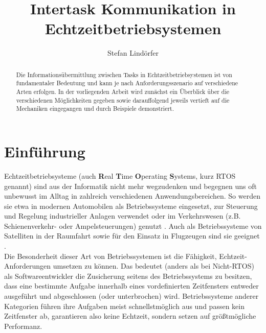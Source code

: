 \documentclass{llncs}
\begin{document}
\title{Intertask Kommunikation in Echtzeitbetriebsystemen}
\author{Stefan Lindörfer}

\date{}

\maketitle

\renewcommand{\abstractname}{Abstract}

\begin{abstract}
	Die Informationsübermittlung zwischen Tasks in Echtzeitbetriebsystemen ist von fundamentaler Bedeutung und kann je nach Anforderungsszenario auf verschiedene Arten erfolgen. In der vorliegenden Arbeit wird zunächst ein Überblick über die verschiedenen Möglichkeiten gegeben sowie darauffolgend jeweils vertieft auf die Mechaniken eingegangen und durch Beispiele demonstriert.
\end{abstract}

\section{Einführung}
Echtzeitbetriebsysteme (auch \textbf{R}eal \textbf{T}ime \textbf{O}perating \textbf{S}ystems, kurz RTOS genannt) sind aus der Informatik nicht mehr wegzudenken und begegnen uns oft unbewusst im Alltag in zahlreich verschiedenen Anwendungsbereichen. So werden sie etwa in modernen Automobilen als Betriebssysteme eingesetzt, zur Steuerung und Regelung industrieller Anlagen verwendet oder im Verkehrswesen (z.B. Schienenverkehr- oder Ampelsteuerungen) genutzt \autocite[vgl.][157]{Winzker2008}. Auch als Betriebssysteme von Satelliten in der Raumfahrt sowie für den Einsatz in Flugzeugen sind sie geeignet \autocite{Wuerzburg2019}.\\

Die Besonderheit dieser Art von Betriebssystemen ist die Fähigkeit, Echtzeit-Anforderungen umsetzen zu können. Das bedeutet (anders als bei Nicht-RTOS) als Softwareentwickler die Zusicherung seitens des Betriebssystems zu besitzen, dass eine bestimmte Aufgabe innerhalb eines vordefinierten Zeitfensters entweder ausgeführt und abgeschlossen (oder unterbrochen) wird. Betriebssysteme anderer Kategorien führen ihre Aufgaben meist schnellstmöglich aus und passen kein Zeitfenster ab, garantieren also keine Echtzeit, sondern setzen auf größtmögliche Performanz.\\
\end{document}
